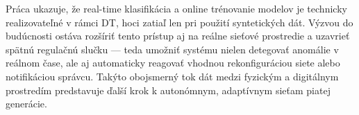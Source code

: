 Práca ukazuje, že real-time klasifikácia a online trénovanie modelov je technicky realizovateľné v rámci DT, hoci zatiaľ len pri použití syntetických dát. Výzvou do budúcnosti ostáva rozšíriť tento prístup aj na reálne sieťové prostredie a uzavrieť spätnú regulačnú slučku — teda umožniť systému nielen detegovať anomálie v reálnom čase, ale aj automaticky reagovať vhodnou rekonfiguráciou siete alebo notifikáciou správcu. Takýto obojsmerný tok dát medzi fyzickým a digitálnym prostredím predstavuje ďalší krok k autonómnym, adaptívnym sieťam piatej generácie. 